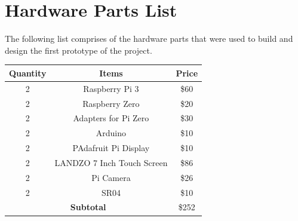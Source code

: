 \documentclass[paper=a4, fontsize=12pt]{scrartcl}
\numberwithin{equation}{section}		%
\numberwithin{figure}{section}			%
\numberwithin{table}{section}				%
\begin{document}
\section{Hardware Parts List}
The following list comprises of the hardware parts that were used to build and design the first prototype of the project.
\begin{table}[h]
\renewcommand{\arraystretch}{1.5}
\centering
\begin{tabular}{|c|c|c|}
\hline
Quantity & Items & Price\\
\hline
2 & Raspberry Pi 3 & \$60\\
\hline
2 & Raspberry Zero & \$20\\
\hline
2 & Adapters for Pi Zero & \$30\\ %
\hline
2 & Arduino & \$10\\
\hline
2 & PAdafruit Pi Display & \$10\\
\hline
2 & LANDZO 7 Inch Touch Screen & \$86\\
\hline
2 & Pi Camera & \$26\\
\hline
2 & SR04 & \$10\\
\hline
\multicolumn{2}{|c|}{\textbf{Subtotal}} & \$252\\
\hline
\end{tabular}
\end{table}
\end{document}
